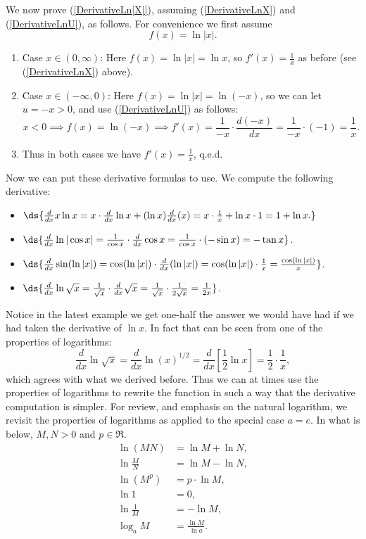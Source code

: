 We now prove (\ref{DerivativeLn|X|}), 
assuming  (\ref{DerivativeLnX}) and (\ref{DerivativeLnU}),
as follows.  For convenience we first assume \label{ProofOfDerivLn|X|Stuff}
$$f(x)=\ln|x|.$$
\begin{enumerate}
\item Case $x\in(0,\infty)$:  Here $f(x)=\ln|x|=\ln x$, so $f'(x)=\frac1x$
      as before (see (\ref{DerivativeLnX}) above).
\item Case $x\in(-\infty,0)$:  Here $f(x)=\ln|x|=\ln(-x)$, so
      we can let $u=-x>0$, and use (\ref{DerivativeLnU}) as follows:
     $$x<0\implies f(x)=\ln(-x)\implies f'(x)=\frac1{-x}\cdot\frac{d(-x)}{dx}
         =\frac{1}{-x}\cdot(-1)=\frac1x.$$
\item Thus in both cases we have $f'(x)=\frac1x$, q.e.d.
\end{enumerate}
Now we can put these derivative formulas to use.
\newpage
\bex We compute the following derivative:
\begin{itemize}
\item $\ds{\frac{d}{dx}x\ln x=x\cdot\frac{d}{dx}\ln x+(\ln x)\frac{d}{dx}(x)
                             =x\cdot\frac1x+\ln x\cdot1=1+\ln x.}$
\item $\ds{\frac{d}{dx}\ln|\cos x|=\frac1{\cos x}\cdot\frac{d}{dx}\cos x
                             =\frac1{\cos x}\cdot(-\sin x)=-\tan x}$.
\item $\ds{\frac{d}{dx}\sin(\ln|x|)=\cos(\ln|x|)\cdot\frac{d}{dx}(\ln|x|)
            =\cos(\ln|x|)\cdot\frac1x=\frac{\cos(\ln|x|)}{x}}$.
\item $\ds{\frac{d}{dx}\ln\sqrt{x}=\frac1{\sqrt{x}}\cdot\frac{d}{dx}\sqrt{x}
            =\frac1{\sqrt{x}}\cdot\frac{1}{2\sqrt{x}}=\frac1{2x}}$.
\end{itemize}
\eex
Notice in the latest example we get one-half the answer we would
have had if we had taken the derivative of $\ln x$.  In fact
that can be seen from one of the properties of logarithms:
$$\frac{d}{dx}\ln\sqrt{x}=\frac{d}{dx}\ln(x)^{1/2}
      =\frac{d}{dx}\left[\frac12\ln x\right]=\frac12\cdot\frac1x,$$
which agrees with what we derived before.  Thus we can at times use the
properties of logarithms to rewrite the function in such a way that
the derivative computation is simpler.  For review, and emphasis on 
the natural logarithm, we revisit the properties of logarithms as
applied to the special case $a=e$.  In what is below, $M,N>0$ and $p\in\Re$.
\begin{align}
\ln(MN)&=\ln M+\ln N,\label{LnMN}\\
\ln\frac{M}{N}&=\ln M-\ln N,\label{LnM/N}\\
\ln(M^p)&=p\cdot\ln M,\label{LnM^P}\\
\ln 1&=0,\label{Ln1=0}\\
\ln\frac1M&=-\ln M,\label{Ln1/M}\\
\log_aM&=\frac{\ln M}{\ln a}.\label{ChangOfBaseWithLn}
\end{align}
